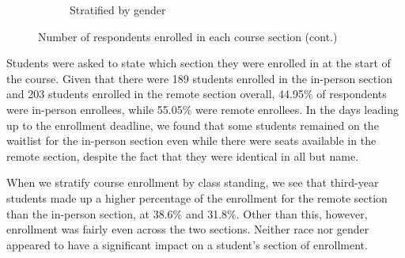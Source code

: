 \begin{figure}[H]
\begin{subfigure}[t]{1\textwidth}
        \caption{Stratified by gender}
    \end{subfigure}
    \captionsetup{justification=centering}
    \caption[]{Number of respondents enrolled in each course section (cont.)}
\end{figure}

Students were asked to state which section they were enrolled in at the start of the course. Given that there were 189 students enrolled in the in-person section and 203 students enrolled in the remote section overall, 44.95\% of respondents were in-person enrollees, while 55.05\% were remote enrollees. In the days leading up to the enrollment deadline, we found that some students remained on the waitlist for the in-person section even while there were seats available in the remote section, despite the fact that they were identical in all but name.

When we stratify course enrollment by class standing, we see that third-year students made up a higher percentage of the enrollment for the remote section than the in-person section, at 38.6\% and 31.8\%. Other than this, however, enrollment was fairly even across the two sections. Neither race nor gender appeared to have a significant impact on a student's section of enrollment.

